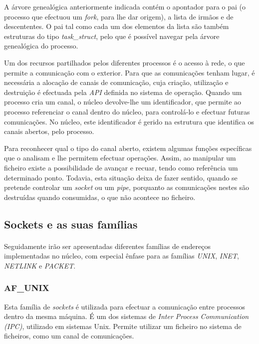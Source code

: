 A árvore genealógica anteriormente indicada contém o apontador para o pai (o processo que efectuou um \textit{fork}, para lhe dar origem), a lista de irmãos e de descententes.
O pai tal como cada um dos elementos da lista são também estruturas do tipo \textit{task\_struct}, pelo que é possível navegar pela árvore genealógica do processo.

Um dos recursos partilhados pelos diferentes processos é o acesso à rede, o que permite a comunicação com o exterior.
Para que as comunicações tenham lugar, é necessária a alocação de canais de comunicação, cuja criação, utilização e destruição é efectuada pela \textit{API} definida no sistema de operação.
Quando um processo cria um canal, o núcleo devolve-lhe um identificador, que permite ao processo referenciar o canal dentro do núcleo, para controlá-lo e efectuar futuras comunicações.
No núcleo, este identificador é gerido na estrutura que identifica os canais abertos, pelo processo.

Para reconhecer qual o tipo do canal aberto, existem algumas funções específicas que o analisam e lhe permitem efectuar operações.
Assim, ao manipular um ficheiro existe a possibilidade de avançar e recuar, tendo como referência um determinado ponto.
Todavia, esta situação deixa de fazer sentido, quando se pretende controlar um \textit{socket} ou um \textit{pipe}, porquanto as comunicações nestes são destruídas quando consumidas, o que não acontece no ficheiro.
 
\subsection{Sockets e as suas famílias}
\label{sub:sockets}



\paragraph*{}
Seguidamente irão ser apresentadas diferentes famílias de endereços implementadas no núcleo, com especial ênfase para as famílias \textit{UNIX}, \textit{INET}, \textit{NETLINK} e \textit{PACKET}.


\subsubsection{AF\_UNIX}

Esta família de \textit{sockets} é utilizada para efectuar a comunicação entre processos dentro da mesma máquina.
É um dos sistemas de \textit{Inter Process Communication (IPC)}, utilizado em sistemas Unix.
\color{red}Permite utilizar um ficheiro no sistema de ficheiros, como um canal de comunicações.\color{black}


